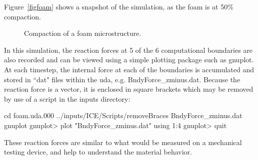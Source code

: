 \documentclass[fleqn]{article}
\begin{document}
Figure~\ref{figfoam} shows a snapshot of the simulation, as the foam
is at 50\% compaction.
\begin{figure}[b]
  \center
  \caption{Compaction of a foam microstructure.}
  \label{figdisks}
\end{figure}

In this simulation, the reaction forces at 5 of the 6 computational boundaries
are also recorded and can be viewed using a simple plotting package such
as gnuplot.  At each timestep, the internal force at each of the boundaries
is accumulated and stored in ``dat" files within the uda,
e.g. BndyForce\_zminus.dat.  Because the reaction force is a vector, it
is enclosed in square brackets which may be removed by use of a script in
the inputs directory:

cd foam.uda.000
../inputs/ICE/Scripts/removeBraces BndyForce\_zminus.dat
gnuplot
gnuplot> plot "BndyForce\_zminus.dat" using 1:4
gnuplot> quit

These reaction forces are similar to what would be measured on a mechanical
testing device, and help to understand the material behavior.


\end{document}
